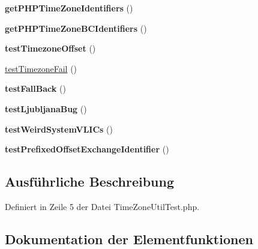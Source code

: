 \begin{DoxyCompactItemize}
{\bfseries get\+P\+H\+P\+Time\+Zone\+Identifiers} ()
\item 
\mbox{\label{class_sabre_1_1_v_object_1_1_time_zone_util_test_ac29d42e58316120c0bb433517f1221f0}} 
{\bfseries get\+P\+H\+P\+Time\+Zone\+B\+C\+Identifiers} ()
\item 
\mbox{\label{class_sabre_1_1_v_object_1_1_time_zone_util_test_a20760f5379b3e8919841f5aefd6d8df9}} 
{\bfseries test\+Timezone\+Offset} ()
\item 
\mbox{\hyperlink{class_sabre_1_1_v_object_1_1_time_zone_util_test_a3255bed2e8124b571464cd7dea91b696}{test\+Timezone\+Fail}} ()
\item 
\mbox{\label{class_sabre_1_1_v_object_1_1_time_zone_util_test_a6960f5020647f82727d7dfa240f1bfe2}} 
{\bfseries test\+Fall\+Back} ()
\item 
\mbox{\label{class_sabre_1_1_v_object_1_1_time_zone_util_test_a5fa9c3e17324a5938ac63395c5ec7d84}} 
{\bfseries test\+Ljubljana\+Bug} ()
\item 
\mbox{\label{class_sabre_1_1_v_object_1_1_time_zone_util_test_ae58e8e55b4b772c9040e2ef2d2edecc8}} 
{\bfseries test\+Weird\+System\+V\+L\+I\+Cs} ()
\item 
\mbox{\label{class_sabre_1_1_v_object_1_1_time_zone_util_test_a8b0f3ef6cc57c9b86902587e9d57aeda}} 
{\bfseries test\+Prefixed\+Offset\+Exchange\+Identifier} ()
\end{DoxyCompactItemize}


\subsection{Ausführliche Beschreibung}


Definiert in Zeile 5 der Datei Time\+Zone\+Util\+Test.\+php.



\subsection{Dokumentation der Elementfunktionen}
\mbox{\label{class_sabre_1_1_v_object_1_1_time_zone_util_test_adca004db3b6fcb360bbc2d16230432c8}} 
